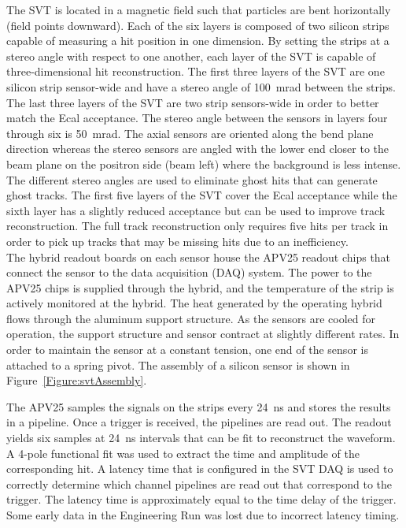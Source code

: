 The SVT is located in a magnetic field such that particles are bent horizontally (field points downward). Each of the six layers is composed of two silicon strips capable of measuring a hit position in one dimension. By setting the strips at a stereo angle with respect to one another, each layer of the SVT is capable of three-dimensional hit reconstruction. The first three layers of the SVT are one silicon strip sensor-wide and have a stereo angle of 100~mrad between the strips. The last three layers of the SVT are two strip sensors-wide in order to better match the Ecal acceptance. The stereo angle between the sensors in layers four through six is 50~mrad. The axial sensors are oriented along the bend plane direction whereas the stereo sensors are angled with the lower end closer to the beam plane on the positron side (beam left) where the background is less intense. The different stereo angles are used to eliminate ghost hits that can generate ghost tracks. The first five layers of the SVT cover the Ecal acceptance while the sixth layer has a slightly reduced acceptance but can be used to improve track reconstruction. The full track reconstruction only requires five hits per track in order to pick up tracks that may be missing hits due to an inefficiency. \\
\indent The hybrid readout boards on each sensor house the APV25 readout chips that connect the sensor to the data acquisition (DAQ) system. The power to the APV25 chips is supplied through the hybrid, and the temperature of the strip is actively monitored at the hybrid. The heat generated by the operating hybrid  flows through the aluminum support structure. As the sensors are cooled for operation, the support structure and sensor contract at slightly different rates. In order to maintain the sensor at a constant tension, one end of the sensor is attached to a spring pivot. The assembly of a silicon sensor is shown in Figure~\ref{Figure:svtAssembly}.

The APV25 samples the signals on the strips every 24~ns and stores the results in a pipeline. Once a trigger is received, the pipelines are read out. The readout yields six samples at 24~ns intervals that can be fit to reconstruct the waveform. A 4-pole functional fit was used to extract the time and amplitude of the corresponding hit. A latency time that is configured in the SVT DAQ is used to correctly determine which channel pipelines are read out that correspond to the trigger. The latency time is approximately equal to the time delay of the trigger. Some early data in the Engineering Run was lost due to incorrect latency timing. 
